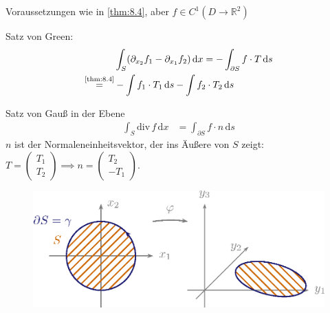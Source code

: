 \documentclass[a4paper,10pt]{scrbook}
\begin{document}
\begin{notice}[Folgerungen:] \label{thm:8.5}
  Voraussetzungen wie in \ref{thm:8.4}, aber $f \in C^1(D \to \mathbb{R}^2)$
  \begin{enum-arab}
    \item Satz von Green:
    \begin{align*}
       & \int_S (\partial_{x_2} f_1 - \partial_{x_1} f_2) \, \mathrm{d}x = - \int_{\partial S} f \cdot T \, \mathrm{d}s \\
      \overset{\text{\ref{thm:8.4}}}{=}& - \int f_1 \cdot T_1 \, \mathrm{d}s - \int f_2 \cdot T_2 \, \mathrm{d}s
    \end{align*}

    \item Satz von Gauß in der Ebene
    \begin{align*}
      \int_S \mathrm{div}\, f \, \mathrm{d}x &= \int_{\partial S} f \cdot n \, \mathrm{d}s
    \end{align*}
    $n$ ist der Normaleneinheitsvektor, der ins Äußere von $S$ zeigt: $T = \left( \begin{smallmatrix} T_1 \\ T_2 \end{smallmatrix} \right) \implies n = \left( \begin{smallmatrix} T_2 \\ - T_1 \end{smallmatrix} \right)$.
    \begin{figure}[H]
      \centering
      \includegraphics[scale=0.2]{images/ana3-tmp-65}
    \end{figure}
  \end{enum-arab}
\end{notice}
\end{document}
